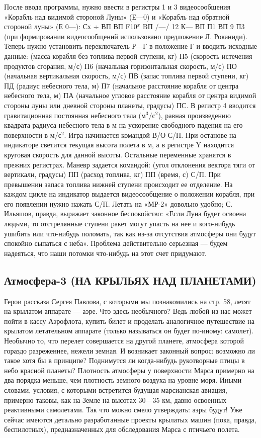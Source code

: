 \documentclass[11pt,a4paper,oneside]{article}
\begin{document}
После ввода программы, нужно ввести в регистры 1 и 3 видеосообщения «Корабль над видимой стороной Луны» (Е—0) и «Корабль над обратной стороной луны» (Е 0—): Сх $\div$ ВП ВП F10$^{x}$ BП /—/ 12 К— ВП П1 ВП 9 П3 (при формировании видеосообщений использовано предложение Л. Роканиди). Теперь нужно установить переключатель Р—Г в положение Г и вводить исходные данные: (масса корабля без топлива первой ступени, кг) П5 (скорость истечения продуктов сгорания, м/с) П6 (начальная горизонтальная скорость, м/с) ПО (начальная вертикальная скорость, м/с) ПВ (запас топлива первой ступени, кг) ПД (радиус небесного тела, м) П7 (начальное расстояние корабля от центра небесного тела, м) ПА (начальное угловое расстояние корабля от центра видимой стороны луны или дневной стороны планеты, градусы) ПС. В регистр 4 вводится гравитационная постоянная небесного тела (м$^{3}$/с$^{2}$), равная произведению квадрата радиуса небесного тела в м на ускорение свободного падения на его поверхности в м/с$^{2}$. Игра начинается командой В/О С/П. При останове на индикаторе светится текущая высота полета в м, а в регистре Y находится круговая скорость для данной высоты. Остальные переменные хранятся в прежних регистрах. Маневр задается командой: (угол отклонения вектора тяги от вертикали, градусы) ПП (расход топлива, кг) ПП (время, с) С/П. При превышении запаса топлива нижней ступени происходит ее отделение. На каждом цикле на индикатор выдается видеосообщение о положении корабля, при его появлении нужно нажать С/П. Летать на «МР-2» довольно удобно; С. Ильяшов, правда, выражает законное беспокойство: «Если Луна будет освоена людьми, то отстрелянные ступени ракет могут упасть на нее и кого-нибудь ушибить или что-нибудь поломать, так как из-за отсутствия атмосферы они будут спокойно сыпаться с неба». Проблема действительно серьезная — будем надеяться, что наши потомки что-нибудь на этот счет придумают.

\subsection{Атмосфера-3 (НА КРЫЛЬЯХ НАД ПЛАНЕТАМИ)}

Герои рассказа Сергея Павлова, с которыми мы познакомились на стр. 58, летят на крылатом аппарате — аэре. Что здесь необычного? Ведь любой из нас может пойти в кассу Аэрофлота, купить билет и проделать аналогичное путешествие на крылатом летательном аппарате (только называться он будет по-иному: самолет). Необычно то, что перелет совершается на другой планете, атмосфера которой гораздо разреженнее, нежели земная. И возникает законный вопрос: возможно ли такое хотя бы в принципе? Поднимутся ли когда-нибудь рукотворные птицы в небо красной планеты?
Плотность атмосферы у поверхности Марса примерно на два порядка меньше, чем плотность земного воздуха на уровне моря. Иными словами, условия, с которыми встретится будущая марсианская авиация, примерно таковы, как на Земле на высотах 30—35 км, давно освоенных реактивными самолетами. Так что можно смело утверждать: аэры будут! Уже сейчас имеются детально разработанные проекты крылатых машин (пока, правда, беспилотных), предназначенных для обследования Марса с птичьего полета.
\end{document}
